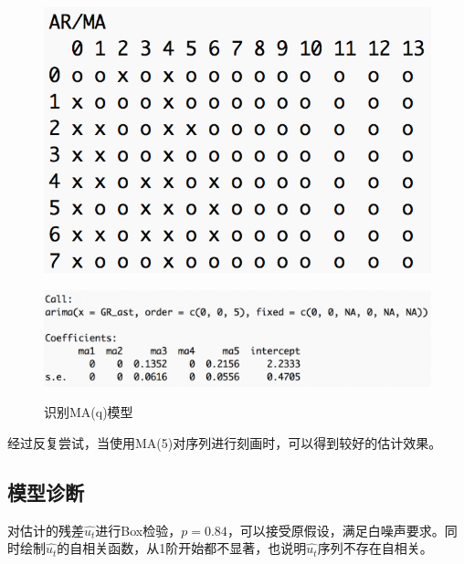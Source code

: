 \documentclass[10.5pt,onecolumn,a4paper]{article}%
\begin{document}
\begin{figure}[h!]
\begin{multicols}{2}
    \begin{minipage}[h]{0.5\textwidth} 
        \centering   
        \includegraphics[width=1\textwidth]{pic/eacf(gr_ast)}   
           \label{fig:apegrast:c}   
    \end{minipage}
    \begin{minipage}[h]{0.5\textwidth} 
        \centering   
        \includegraphics[width=1\textwidth]{pic/ma5}   
           \label{fig:apegrast:d}   
    \end{minipage}    
    \caption{识别MA(q)模型} \label{fig:apegrast}
\end{multicols}
\end{figure}




经过反复尝试，当使用MA(5)对序列进行刻画时，可以得到较好的估计效果。


\subsection{模型诊断}

对估计的残差$\hat{u_t}$进行Box检验，$p=0.84$，可以接受原假设，满足白噪声要求。同时绘制$\hat{u_t}$的自相关函数，从1阶开始都不显著，也说明$\hat{u_t}$序列不存在自相关。
\end{document}
